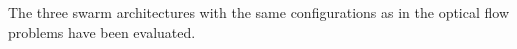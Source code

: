 


\noindent The three swarm architectures with the same configurations as
in the optical flow problems have been evaluated.
%
